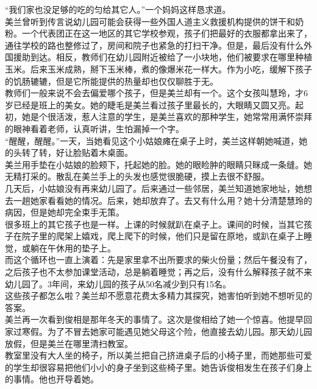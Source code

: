 “我们家也没足够的吃的匀给其它人。”一个妈妈这样恳求道。\\

美兰曾听到传言说幼儿园可能会获得一些外国人道主义救援机构提供的饼干和奶粉。一个代表团正在这一地区的其它学校参观，孩子们把最好的衣服都拿出来了，通往学校的路也整修过了，房间和院子也紧急的打扫干净。但是，最后没有什么外国援助到达。相反，教师们在幼儿园附近被给了一小块地，他们被要求在哪里种植玉米。后来玉米成熟，掰下玉米棒，煮的像爆米花一样大。作为小吃，缓解下孩子的饥肠辘辘，但是它所能提供的热量却也仅仅聊胜于无。\\

教师们一般来说不会去偏爱哪个孩子，但是美兰却有一个。这个女孩叫慧玲，才6岁已经是班上的美女。她的睫毛是美兰看过孩子里最长的，大眼睛又圆又亮。起初，她是个很活泼，惹人注意的学生，是美兰喜欢的那种学生，她常常用满怀崇拜的眼神看着老师，认真听讲，生怕漏掉一个字。\\

“醒醒，醒醒。”一天，当她看见这个小姑娘瘫在桌子上时，美兰这样朝她喊道，她的头转了转，好让脸贴着木桌面。\\

美兰用手垫在小姑娘的脸颊下，托起她的脸。她的眼睑肿的眼睛只眯成一条缝。她无精打采的。散乱在美兰手上的头发也感觉很脆硬，摸上去很不舒服。\\

几天后，小姑娘没有再来幼儿园了。后来通过一些邻居，美兰知道她家地址，她想去一趟她家看看她的情况。后来，她却放弃了。去又有什么用？她十分清楚慧玲的病因，但是她却完全束手无策。\\

很多班上的其它孩子也是一样。上课的时候就趴在桌子上。课间的时候，当其它孩子在院子里的爬架上嬉戏，爬上爬下的时候，他们只是留在原地，或趴在桌子上睡觉，或躺在午休用的垫子上。\\

而这个循环也一直上演着：先是家里拿不出所要求的柴火份量；然后午餐没有了，之后孩子也不太参加课堂活动，总是躺着睡觉；再之后，没有什么解释孩子就不来幼儿园了。3年间，来幼儿园的孩子从50名减少到只有15名。\\

这些孩子都怎么啦？美兰却不愿意花费太多精力其探究，她害怕听到她不想听见的答案。\\

美兰再一次看到俊相是那年冬天的事情了。这次是俊相给了她一个惊喜。他提早回家过寒假。为了不冒去她家可能遇见她父母这个险，他直接去幼儿园。那天幼儿园放假，但是美兰在哪里清扫教室。\\

教室里没有大人坐的椅子，所以美兰把自己挤进桌子后的小椅子里，而她那些可爱的学生却很容易把他们小小的身子坐到这些椅子里。她告诉俊相发生在孩子们身上的事情。他也开导着她。\\

